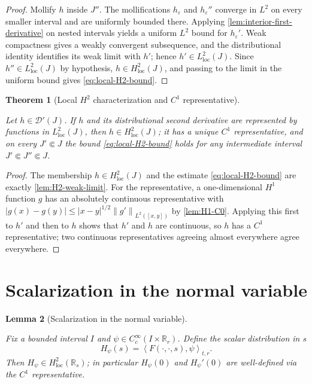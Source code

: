 \documentclass[11pt,oneside]{book}
\providecommand{\uses}[1]{}
\newtheorem{theorem}{Theorem}[chapter]
\newtheorem{lemma}[theorem]{Lemma}
\theoremstyle{definition}
\theoremstyle{remark}
\newcommand{\R}{\mathbb R}
\newcommand{\D}{\mathcal D}
\newcommand{\1}{\mathbf 1}
\newcommand{\loc}{\mathrm{loc}}
\newcommand{\norm}[1]{\left\lVert #1\right\rVert}
\newcommand{\abs}[1]{\left\lvert #1\right\rvert}
\newcommand{\pair}[2]{\left\langle #1,#2\right\rangle}
\newcommand{\eps}{\varepsilon}
\begin{document}
\begin{proof}
\uses{lem:interior-first-derivative}
Mollify $h$ inside $J''$. The mollifications $h_\eps$ and $h_\eps''$ converge in
$L^2$ on every smaller interval and are uniformly bounded there. Applying
\cref{lem:interior-first-derivative} on nested intervals yields a uniform $L^2$
bound for $h_\eps'$. Weak compactness gives a weakly convergent subsequence, and
the distributional identity identifies its weak limit with $h'$; hence
$h'\in L^2_{\loc}(J)$. Since $h''\in L^2_{\loc}(J)$ by hypothesis,
$h\in H^2_{\loc}(J)$, and passing to the limit in the uniform bound gives
\eqref{eq:local-H2-bound}.
\end{proof}

\begin{theorem}[Local $H^2$ characterization and $C^1$ representative]\label{thm:local-H2-characterization}
\uses{def:Hs-space}
Let $h\in\D'(J)$. If $h$ and its distributional second derivative are represented
by functions in $L^2_{\loc}(J)$, then $h\in H^2_{\loc}(J)$; it has a unique $C^1$
representative, and on every $J'\Subset J$ the bound \eqref{eq:local-H2-bound}
holds for any intermediate interval $J'\Subset J''\Subset J$.
\end{theorem}

\begin{proof}
\uses{lem:H2-weak-limit, lem:H1-C0}
The membership $h\in H^2_{\loc}(J)$ and the estimate \eqref{eq:local-H2-bound}
are exactly \cref{lem:H2-weak-limit}. For the representative, a one-dimensional
$H^1$ function $g$ has an absolutely continuous representative with
$\abs{g(x)-g(y)}\le\abs{x-y}^{1/2}\norm{g'}_{L^2([x,y])}$ by
\cref{lem:H1-C0}. Applying this first to $h'$ and then to $h$ shows that $h'$ and
$h$ are continuous, so $h$ has a $C^1$ representative; two continuous
representatives agreeing almost everywhere agree everywhere.
\end{proof}

\section{Scalarization in the normal variable}

\begin{lemma}[Scalarization in the normal variable]\label{lem:scalarization-normal}
\uses{def:normal-tangential-coords, def:exterior-product}
Fix a bounded interval $I$ and $\psi\in C_c^\infty(I\times\R_r)$. Define the
scalar distribution in $s$
\begin{equation}
 H_\psi(s)=\pair{F(\cdot,\cdot,s)}{\psi}_{t,r}. \label{eq:Hpsi-def}
\end{equation}
Then $H_\psi\in H^2_{\loc}(\R_s)$; in particular $H_\psi(0)$ and $H_\psi'(0)$ are
well-defined via the $C^1$ representative.
\end{lemma}
\end{document}
